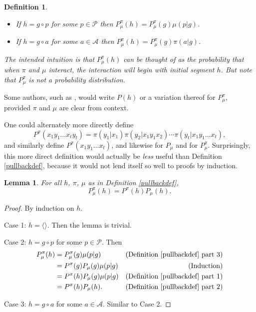 \documentclass[twoside]{article}
\newtheorem{definition}[theorem]{Definition}
\newtheorem{lemma}[theorem]{Lemma}
\begin{document}
\begin{definition}
\begin{enumerate}
\begin{itemize}
            \item
            If $h=g\circ p$ for some $p\in\mathcal P$ then
            $P^\pi_\mu(h)=P^\pi_\mu(g)\mu(p|g)$.
            \item
            If $h=g\circ a$ for some $a\in\mathcal A$ then
            $P^\pi_\mu(h)=P^\pi_\mu(g)\pi(a|g)$.
        \end{itemize}
        The intended intuition is that $P^\pi_\mu(h)$ can be thought of as
        the probability that when $\pi$ and $\mu$ interact, the interaction
        will begin with initial segment $h$. But note that
        $P^\pi_\mu$ is \emph{not} a probability distribution.
    \end{enumerate}
\end{definition}

Some authors, such as \cite{hutter2009discrete}, would write $P(h)$ or a variation thereof
for $P^\pi_\mu$, provided $\pi$ and $\mu$ are clear from context.

One could alternately more directly define
\[
    P^\pi(x_1y_1\ldots x_ty_t)
    = \pi(y_1|x_1)\pi(y_2|x_1y_1x_2)\cdots \pi(y_t|x_1y_1\ldots x_t),
\]
and similarly define $P^\pi(x_1y_1\ldots x_t)$,
and likewise for $P_\mu$ and for $P^\pi_\mu$. Surprisingly, this more
direct definition would actually be \emph{less} useful than
Definition \ref{pullbackdef}, because it would not lend itself so well
to proofs by induction.

\begin{lemma}
\label{factorizationlemma}
    For all $h$, $\pi$, $\mu$ as in Definition \ref{pullbackdef},
    \[
        P^\pi_\mu(h) = P^\pi(h)P_\mu(h).
    \]
\end{lemma}

\begin{proof}
    By induction on $h$.

    Case 1: $h=\langle\rangle$. Then the lemma is trivial.

    Case 2: $h=g\circ p$ for some $p\in\mathcal P$.
        Then
        \begin{align*}
            P^\pi_\mu(h)
                &= P^\pi_\mu(g)\mu(p|g)
                    &\mbox{(Definition \ref{pullbackdef} part 3)}\\
                &= P^\pi(g)P_\mu(g)\mu(p|g)
                    &\mbox{(Induction)}\\
                &= P^\pi(h)P_\mu(g)\mu(p|g)
                    &\mbox{(Definition \ref{pullbackdef} part 1)}\\
                &= P^\pi(h)P_\mu(h).
                    &\mbox{(Definition \ref{pullbackdef} part 2)}
        \end{align*}

    Case 3: $h=g\circ a$ for some $a\in\mathcal A$.
        Similar to Case 2.
\end{proof}
\end{document}

